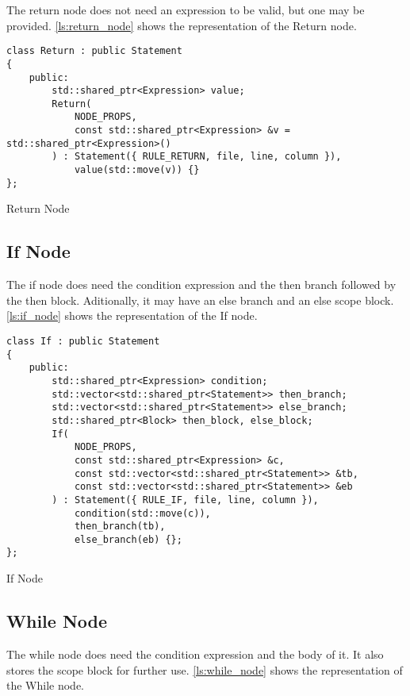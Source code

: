 The return node does not need an expression to be valid, but one may be provided.
\autoref{ls:return_node} shows the representation of the Return node.

\begin{listing}[H]
\begin{verbatim}
class Return : public Statement
{
    public:
        std::shared_ptr<Expression> value;
        Return(
            NODE_PROPS,
            const std::shared_ptr<Expression> &v = std::shared_ptr<Expression>()
        ) : Statement({ RULE_RETURN, file, line, column }),
            value(std::move(v)) {}
};
\end{verbatim}
\caption{Return Node}
\label{ls:return_node}
\end{listing}

\subsection{If Node}

The if node does need the condition expression and the then branch followed by the then block.
Aditionally, it may have an else branch and an else scope block.
\autoref{ls:if_node} shows the representation of the If node.

\begin{listing}[H]
\begin{verbatim}
class If : public Statement
{
    public:
        std::shared_ptr<Expression> condition;
        std::vector<std::shared_ptr<Statement>> then_branch;
        std::vector<std::shared_ptr<Statement>> else_branch;
        std::shared_ptr<Block> then_block, else_block;
        If(
            NODE_PROPS,
            const std::shared_ptr<Expression> &c,
            const std::vector<std::shared_ptr<Statement>> &tb,
            const std::vector<std::shared_ptr<Statement>> &eb
        ) : Statement({ RULE_IF, file, line, column }),
            condition(std::move(c)),
            then_branch(tb),
            else_branch(eb) {};
};
\end{verbatim}
\caption{If Node}
\label{ls:if_node}
\end{listing}

\subsection{While Node}

The while node does need the condition expression and the body of it.
It also stores the scope block for further use.
\autoref{ls:while_node} shows the representation of the While node.

